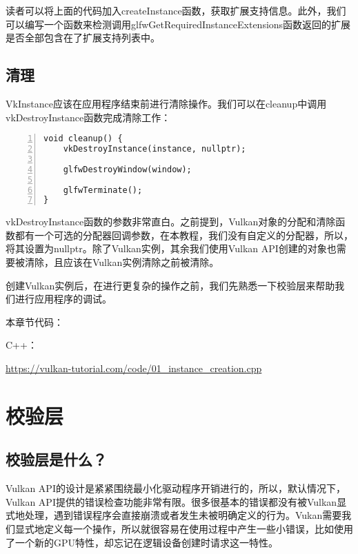 \documentclass{ctexart}
\begin{document}
读者可以将上面的代码加入createInstance函数，获取扩展支持信息。此外，我们可以编写一个函数来检测调用glfwGetRequiredInstanceExtensions函数返回的扩展是否全部包含在了扩展支持列表中。

\subsection{清理}

VkInstance应该在应用程序结束前进行清除操作。我们可以在cleanup中调用vkDestroyInstance函数完成清除工作：

\begin{lstlisting}[language={[ANSI]C},keywordstyle=\color{blue!70},commentstyle=\color{red!50!green!50!blue!50},frame=shadowbox, rulesepcolor=\color{red!20!green!20!blue!20},basicstyle=\small,numbers=left, numberstyle=\tiny,breaklines=true]
void cleanup() {
	vkDestroyInstance(instance, nullptr);

	glfwDestroyWindow(window);

	glfwTerminate();
}
\end{lstlisting}

vkDestroyInstance函数的参数非常直白。之前提到，Vulkan对象的分配和清除函数都有一个可选的分配器回调参数，在本教程，我们没有自定义的分配器，所以，将其设置为nullptr。除了Vulkan实例，其余我们使用Vulkan API创建的对象也需要被清除，且应该在Vulkan实例清除之前被清除。

创建Vulkan实例后，在进行更复杂的操作之前，我们先熟悉一下校验层来帮助我们进行应用程序的调试。

本章节代码：

C++：

\url{https://vulkan-tutorial.com/code/01_instance_creation.cpp}

\newpage
\section{校验层}

\subsection{校验层是什么？}

Vulkan API的设计是紧紧围绕最小化驱动程序开销进行的，所以，默认情况下，Vulkan API提供的错误检查功能非常有限。很多很基本的错误都没有被Vulkan显式地处理，遇到错误程序会直接崩溃或者发生未被明确定义的行为。Vukan需要我们显式地定义每一个操作，所以就很容易在使用过程中产生一些小错误，比如使用了一个新的GPU特性，却忘记在逻辑设备创建时请求这一特性。
\end{document}

